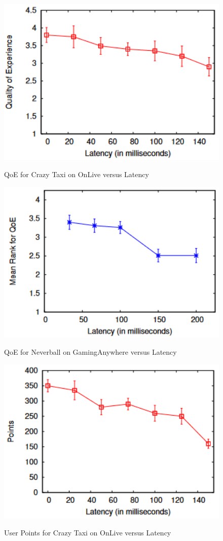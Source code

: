 \begin{figure}[H]
	\centering
	\includegraphics[width=12cm]{../img/fig20.png}
	\caption{QoE for Crazy Taxi on OnLive versus Latency}
	\parencite[Chapter 4, Figure 4]{claypool2014effects}
\end{figure}
\begin{figure}[H]
	\centering
	\includegraphics[width=12cm]{../img/fig21.png}
	\caption{QoE for Neverball on GamingAnywhere versus Latency}
	\parencite[Chapter 4, Figure 5]{claypool2014effects}
\end{figure}
\begin{figure}[H]
	\centering
	\includegraphics[width=12cm]{../img/fig22.png}
	\caption{User Points for Crazy Taxi on OnLive versus Latency}
	\parencite[Chapter 4, Figure 6]{claypool2014effects}
\end{figure}
